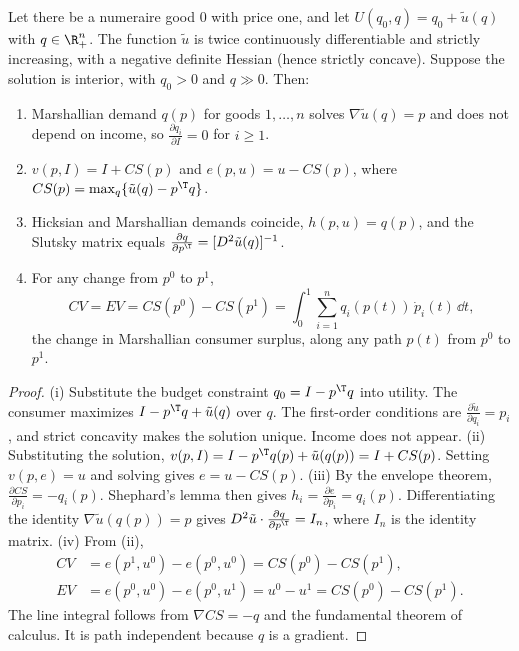 \begin{proposition}\label{prop:B-quasilinear}
Let there be a numeraire good $0$ with price one, and let $U(q_0, q) = q_0 + \tilde u(q)$ with
$q \in \R^n_+$. The function $\tilde u$ is twice continuously differentiable and strictly increasing, with a
negative definite Hessian (hence strictly concave).
Suppose the solution is interior, with $q_0 > 0$ and $q \gg 0$. Then:
\begin{enumerate}[label=(\roman*)]
\item Marshallian demand $q(p)$ for goods $1, \dots, n$ solves $\nabla\tilde u(q) = p$ and does not depend on
  income, so $\frac{\partial q_i}{\partial I} = 0$ for $i \geq 1$.
\item $v(p, I) = I + CS(p)$ and $e(p, u) = u - CS(p)$, where $CS(p) = \max_q\{\tilde u(q) - p^\T q\}$.
\item Hicksian and Marshallian demands coincide, $h(p, u) = q(p)$, and the Slutsky matrix equals
  $\frac{\partial q}{\partial p^\T} = [D^2\tilde u(q)]^{-1}$.
\item For any change from $p^0$ to $p^1$,
\begin{equation}\label{eq:B-quasilinear-cv}
CV = EV = CS(p^0) - CS(p^1) = \int_0^1\sum_{i=1}^nq_i(p(t))\,\dot p_i(t)\,\dd t,
\end{equation}
  the change in Marshallian consumer surplus, along any path $p(t)$ from $p^0$ to $p^1$.
\end{enumerate}
\end{proposition}

\begin{proof}
(i) Substitute the budget constraint $q_0 = I - p^\T q$ into utility. The consumer maximizes
$I - p^\T q + \tilde u(q)$ over $q$. The first-order conditions are $\frac{\partial\tilde u}{\partial q_i} = p_i$,
and strict concavity makes the solution unique. Income does not appear. (ii) Substituting the solution,
$v(p, I) = I - p^\T q(p) + \tilde u(q(p)) = I + CS(p)$. Setting $v(p, e) = u$ and solving gives
$e = u - CS(p)$. (iii) By the envelope theorem, $\frac{\partial CS}{\partial p_i} = -q_i(p)$. Shephard's lemma then
gives $h_i = \frac{\partial e}{\partial p_i} = q_i(p)$. Differentiating the identity $\nabla\tilde u(q(p)) = p$ gives
$D^2\tilde u\cdot\frac{\partial q}{\partial p^\T} = I_n$, where $I_n$ is the identity matrix. (iv) From (ii),
\begin{align*}
CV &= e(p^1, u^0) - e(p^0, u^0) = CS(p^0) - CS(p^1), \\
EV &= e(p^0, u^0) - e(p^0, u^1) = u^0 - u^1 = CS(p^0) - CS(p^1).
\end{align*}
The line integral follows from $\nabla CS = -q$ and the fundamental theorem of calculus. It is path
independent because $q$ is a gradient.
\end{proof}

